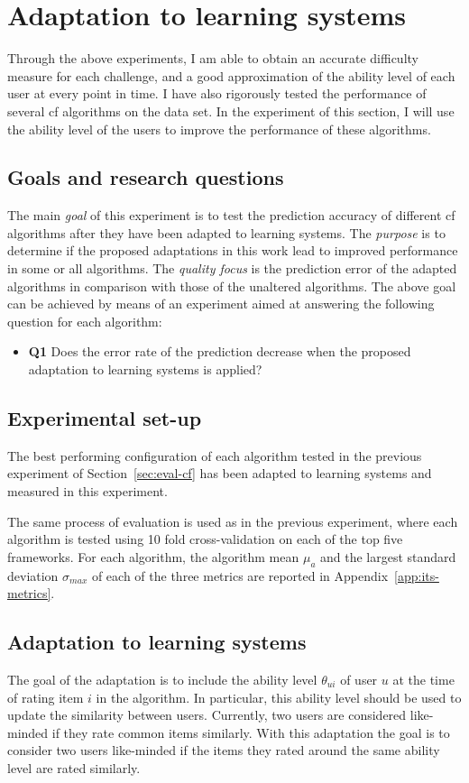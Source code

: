 \section{Adaptation to learning systems}
\label{sec:eval-learning}

Through the above experiments, I am able to obtain an accurate difficulty measure for each challenge, and a good approximation of the ability level of each user at every point in time.
I have also rigorously tested the performance of several \gls{cf} algorithms on the data set.
In the experiment of this section, I will use the ability level of the users to improve the performance of these algorithms.

\subsection{Goals and research questions}
The main \textit{goal} of this experiment is to test the prediction accuracy of different \gls{cf} algorithms after they have been adapted to learning systems.
The \textit{purpose} is to determine if the proposed adaptations in this work lead to improved performance in some or all algorithms.
The \textit{quality focus} is the prediction error of the adapted algorithms in comparison with those of the unaltered algorithms.
The above goal can be achieved by means of an experiment aimed at answering the following question for each algorithm:
\begin{itemize}
    \item \textbf{Q1} Does the error rate of the prediction decrease when the proposed adaptation to learning systems is applied?
\end{itemize}

\subsection{Experimental set-up}
The best performing configuration of each algorithm tested in the previous experiment of Section~\ref{sec:eval-cf} has been adapted to learning systems and measured in this experiment.

The same process of evaluation is used as in the previous experiment, where each algorithm is tested using 10 fold cross-validation on each of the top five frameworks.
For each algorithm, the algorithm mean $\mu_a$ and the largest standard deviation $\sigma_{max}$ of each of the three metrics are reported in Appendix~\ref{app:its-metrics}.

\subsection{Adaptation to learning systems}
The goal of the adaptation is to include the ability level $\theta_{ui}$ of user $u$ at the time of rating item $i$ in the algorithm.
In particular, this ability level should be used to update the similarity between users.
Currently, two users are considered like-minded if they rate common items similarly.
With this adaptation the goal is to consider two users like-minded if the items they rated around the same ability level are rated similarly.

